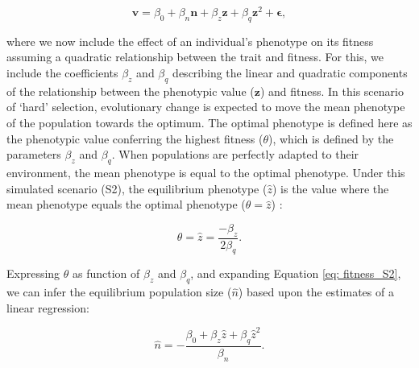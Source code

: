 \documentclass{article}
\begin{document}
	\begin{equation} \label{eq: fitness_S2}
	\bm{v}=\beta_{0} +\beta_{n} \bm{n} + \beta_{z} \bm{z} + \beta_{q} \bm{z}^2 +  \bm{\epsilon},
	\end{equation}
	
	\noindent where we now include the effect of an individual's phenotype on its fitness assuming a quadratic relationship between the trait and fitness. For this, we include the coefficients $\beta_{z}$ and $\beta_{q}$ describing the linear and quadratic components of the relationship between the phenotypic value ($\bm{z}$) and fitness. In this scenario of `hard' selection, evolutionary change is expected to move the mean phenotype of the population towards the optimum. The optimal phenotype is defined here as the phenotypic value conferring the highest fitness ($\theta$), which is defined by the parameters $\beta_{z}$ and $\beta_{q}$. When populations are perfectly adapted to their environment, the mean phenotype is equal to the optimal phenotype. Under this simulated scenario (S2), the equilibrium phenotype ($\hat{z}$) is the value where the mean phenotype equals the optimal phenotype ($\theta=\hat{z}$) :
	
	\begin{equation} \label{eq: eq_Z_S2}
	\theta=\hat{z}=\frac{-\beta_{z}}{2\beta_{q}}.
	\end{equation}
	
	\noindent Expressing $\theta$ as function of $\beta_{z}$ and $\beta_{q}$, and expanding Equation \ref{eq: fitness_S2}, we can infer the equilibrium population size ($\hat{n}$) based upon the estimates of a linear regression:
	
	\begin{equation}\label{eq: eq_N_S2}
	\hat{n}=-\frac{\beta_{0}+ \beta_{z}\hat{z} + \beta_{q}\hat{z}^2}{\beta_n}. 
	\end{equation}
	
\end{document}
